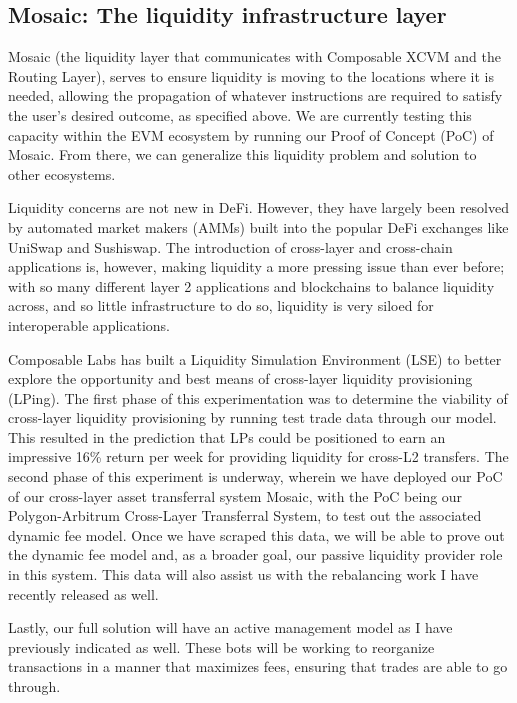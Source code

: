 \subsection{Mosaic: The liquidity infrastructure layer}

Mosaic (the liquidity layer that communicates with Composable XCVM and the Routing Layer), serves to ensure liquidity is moving to the locations where it is needed, allowing the propagation of whatever instructions are required to satisfy the user’s desired outcome, as specified above. We are currently testing this capacity within the EVM ecosystem by running our Proof of Concept (PoC) of Mosaic. From there, we can generalize this liquidity problem and solution to other ecosystems.

Liquidity concerns are not new in DeFi. However, they have largely been resolved by automated market makers (AMMs) built into the popular DeFi exchanges like UniSwap and Sushiswap. The introduction of cross-layer and cross-chain applications is, however, making liquidity a more pressing issue than ever before; with so many different layer 2 applications and blockchains to balance liquidity across, and so little infrastructure to do so, liquidity is very siloed for interoperable applications.

Composable Labs has built a Liquidity Simulation Environment (LSE) to better explore the opportunity and best means of cross-layer liquidity provisioning (LPing). The first phase of this experimentation was to determine the viability of cross-layer liquidity provisioning by running test trade data through our model. This resulted in the prediction that LPs could be positioned to earn an impressive 16\% return per week for providing liquidity for cross-L2 transfers. The second phase of this experiment is underway, wherein we have deployed our PoC of our cross-layer asset transferral system Mosaic, with the PoC being our Polygon-Arbitrum Cross-Layer Transferral System, to test out the associated dynamic fee model. Once we have scraped this data, we will be able to prove out the dynamic fee model and, as a broader goal, our passive liquidity provider role in this system. This data will also assist us with the rebalancing work I have recently released as well.

Lastly, our full solution will have an active management model as I have previously indicated as well. These bots will be working to reorganize transactions in a manner that maximizes fees, ensuring that trades are able to go through.


